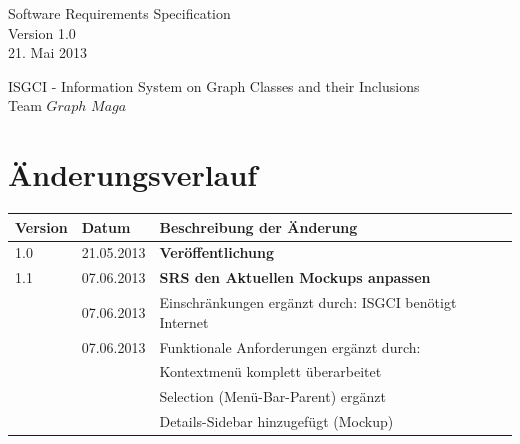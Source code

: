 \documentclass[11pt,a4paper]{article}
\begin{document}
\thispagestyle{empty} %
\vspace*{5cm} 
\begin{center}
{\huge Software Requirements Specification}\\
{\large Version 1.0}\\
{\large 21. Mai 2013}\\
\end{center}

\begin{center}
{\large ISGCI - Information System on Graph Classes and their Inclusions}\\
{\large Team $Graph$ $Maga$}
\end{center}




 
 
 
 \newpage
 
 \renewcommand{\contentsname}{Inhaltsverzeichnis}
 \tableofcontents %

\vfill 
 \section{Änderungsverlauf}

\hspace*{-1cm}
\begin{tabular}{|l|l|p{10.5cm}|}\hline
 \textbf{Version}&\textbf{Datum}&\textbf{Beschreibung der \"Anderung}\\\hline
 1.0&21.05.2013&\textbf{Veröffentlichung}\\\hline
 1.1& 07.06.2013 & \textbf{SRS den Aktuellen Mockups anpassen} \\\hline
 & 07.06.2013 &  Einschränkungen ergänzt durch: ISGCI benötigt Internet  \\\hline
  & 07.06.2013 &  Funktionale Anforderungen ergänzt durch:  \\\hline
   &  &  Kontextmenü komplett überarbeitet \\\hline 
    &  &  Selection (Menü-Bar-Parent) ergänzt \\\hline
     &  &  Details-Sidebar hinzugefügt (Mockup) \\\hline
 
 
 
\end{tabular}\\
\end{document}
